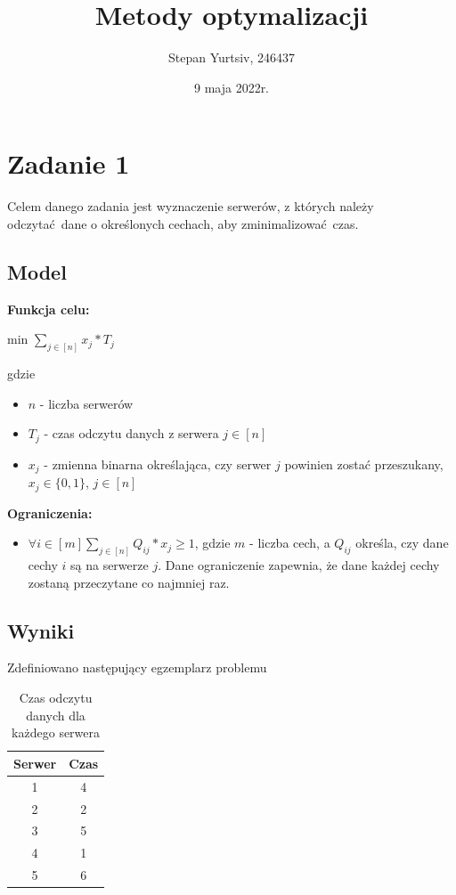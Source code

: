 \documentclass[12pt, a4paper]{article}
\title{Metody optymalizacji}
\author{Stepan Yurtsiv, 246437}
\date{9 maja 2022r.}
\begin{document}
\maketitle

\section{Zadanie 1}

Celem danego zadania jest wyznaczenie serwerów, z których należy odczytać dane o określonych cechach,
aby zminimalizować czas.

\subsection{Model}

\textbf{Funkcja celu:}

\begin{center}
	min \textbf{$\displaystyle\sum_{j \in [n]} x_j * T_j$}
\end{center}
gdzie

\begin{itemize}
    \item $n$ - liczba serwerów
    \item $T_j$ - czas odczytu danych z serwera $j \in [n]$
    \item $x_j$ - zmienna binarna określająca, czy serwer $j$ powinien zostać przeszukany, $x_j \in \{0, 1\}$, $j \in [n]$
\end{itemize}
\textbf{Ograniczenia:}

\begin{itemize}
    \item {$\forall{i \in [m]}\displaystyle\sum_{j \in [n]} Q_{ij} * x_j \geq 1$}, gdzie $m$ - liczba cech, a $Q_{ij}$ określa, czy dane cechy $i$ są na serwerze $j$. Dane ograniczenie zapewnia, że dane każdej cechy zostaną przeczytane co najmniej raz.
\end{itemize}

\subsection{Wyniki}

Zdefiniowano następujący egzemplarz problemu

\begin{table}[H]
\begin{center}
\begin{tabular}{|c|c|}
  \hline
  Serwer & Czas \\
  \hline
  1 & 4 \\
  \hline
  2 & 2 \\
  \hline
  3 & 5 \\
  \hline
  4 & 1 \\
  \hline
  5 & 6 \\
  \hline
\end{tabular}
\caption{Czas odczytu danych dla każdego serwera}
\end{center}
\end{table}
\end{document}
